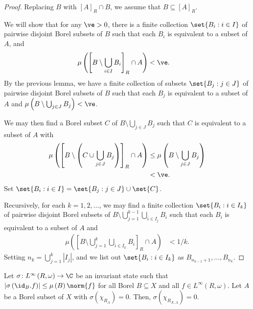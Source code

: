 \documentclass[10pt]{mypackage}
\begin{document}
\begin{proof}
  Replacing $B$ with $\left[ A \right]_R\cap B$, we assume that $B\subseteq \left[ A \right]_R$.

  We will show that for any $\ve > 0$, there is a finite collection $\set{B_i : i\in I}$ of pairwise disjoint Borel subsets of $B$ such that each $B_i$ is equivalent to a subset of $A$, and
  \begin{align*}
    \mu\left( \left[ B\setminus\bigcup_{i\in I}B_i \right]_R\cap A \right) &< \ve.
  \end{align*}
  By the previous lemma, we have a finite collection of subsets $\set{B_j : j\in J}$ of pairwise disjoint Borel subsets of $B$ such that each $B_j$ is equivalent to a subset of $A$ and $\mu\left( B\setminus \bigcup_{j\in J}B_j \right) < \ve$.

  We may then find a Borel subset $C$ of $B\setminus \bigcup_{j\in J}B_j$ such that $C$ is equivalent to a subset of $A$ with
  \begin{align*}
    \mu\left( \left[ B\setminus \left( C\cup \bigcup_{j\in J}B_j \right) \right]_R \cap A \right) &\leq \mu\left( B\setminus \bigcup_{j\in J}B_j \right)\\
      &< \ve.
  \end{align*}
  Set $\set{B_i : i\in I} = \set{B_j : j\in J}\cup \set{C}$.

  Recursively, for each $k = 1,2,\dots$, we may find a finite collection $\set{B_i : i\in I_k}$ of pairwise disjoint Borel subsets of $B\setminus \bigcup_{j=1}^{k-1}\bigcup_{i\in I_j}B_i$ such that each $B_i$ is equivalent to a subset of $A$ and
  \begin{align*}
    \mu\left( \left[ B\setminus \bigcup_{j=1}^{k}\bigcup_{i\in I_k}B_i \right]_{R}\cap A \right) &< 1/k.
  \end{align*}
  Setting $n_k = \bigcup_{j=1}^{k}\left\vert I_j \right\vert$, and we list out $\set{B_i : i\in I_k}$ as $B_{n_{k-1}+1},\dots,B_{n_k}$.
\end{proof}
\begin{lemma}
  Let $\sigma\colon L^{\infty}\left( R,\omega \right)\to \C$ be an invariant state such that $\left\vert \sigma\left( \id_B.f \right) \right\vert\leq \mu\left( B \right)\norm{f}$ for all Borel $B\subseteq X$ and all $f\in L^{\infty}\left( R,\omega \right)$. Let $A$ be a Borel subset of $X$ with $\sigma\left( \chi_{R_A} \right) = 0$. Then, $\sigma\left( \chi_{R_{X,A}} \right) = 0$.
\end{lemma}
\nocite{kerr_and_li,topics_in_orbit_equivalence}
\end{document}
